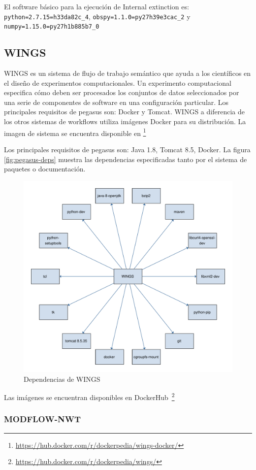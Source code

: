 El software básico para la ejecución de Internal extinction es:  \verb|python=2.7.15=h33da82c_4|, \verb|obspy=1.1.0=py27h39e3cac_2| y \verb|numpy=1.15.0=py27h1b885b7_0|



\subsection{WINGS}

WINGS es un sistema de flujo de trabajo semántico que ayuda a los científicos en el diseño de experimentos computacionales. Un experimento computacional especifica cómo deben ser procesados los conjuntos de datos seleccionados por una serie de componentes de software en una configuración particular.
Los principales requisitos de pegasus son: Docker y Tomcat.
WINGS a diferencia de los otros sistemas de workflows utiliza imágenes Docker para su distribución. La imagen de sistema se encuentra disponible en \footnote{\url{https://hub.docker.com/r/dockerpedia/wings-docker/}}

Los principales requisitos de pegasus son: Java 1.8, Tomcat 8.5, Docker. La figura \ref{fig:pegasus-deps} muestra las dependencias especificadas tanto por el sistema de paquetes o documentación.

\begin{figure}[t]
\centering
\includegraphics[width=.5\textwidth]{Figures/wings-deps}
\caption{Dependencias de WINGS}\label{fig:wigs-deps}
\end{figure}



Las imágenes se encuentran disponibles en DockerHub~\footnote{\url{https://hub.docker.com/r/dockerpedia/wings/}}


\subsubsection{MODFLOW-NWT}


